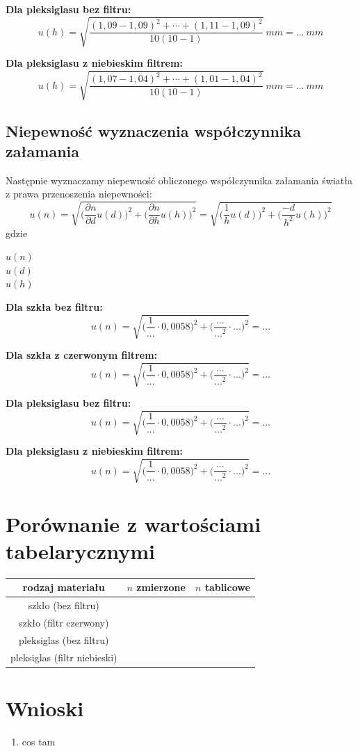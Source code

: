 \documentclass[a4paper,11pt]{article}
\begin{document}
\textbf{Dla pleksiglasu bez filtru:}
$$u(h)=\displaystyle \sqrt{\frac{(1,09-1,09)^{2}+\cdots +(1,11-1,09)^{2}}{10(10-1)}}~mm= ...~mm$$

\textbf{Dla pleksiglasu z niebieskim filtrem:}
$$u(h)=\displaystyle \sqrt{\frac{(1,07-1,04)^{2}+\cdots +(1,01-1,04)^{2}}{10(10-1)}}~mm= ...~mm$$

\subsection{Niepewność wyznaczenia współczynnika załamania}
Następnie wyznaczamy niepewność obliczonego współczynnika załamania światła z prawa przenoszenia niepewności:
$$ u(n) =\sqrt{\bigg(\frac{\partial n}{\partial d}u(d)\bigg)^2+\bigg(\frac{\partial n}{\partial h}u(h)\bigg)^2} = \sqrt{\bigg(\frac{1}{h}u(d)\bigg)^2+\bigg(\frac{-d}{h^2}u(h)\bigg)^2}$$
gdzie 
\begin{description}
\item [$u(n)$]
\item [$u(d)$]
\item [$u(h)$]
\end{description}

\textbf{Dla szkła bez filtru:}
$$ u(n) = \sqrt{\bigg(\frac{1}{...}\cdot 0,0058\bigg)^2+\bigg(\frac{...} {...^2}\cdot ...\bigg)^2} = ...$$

\textbf{Dla szkła z czerwonym filtrem:}
$$ u(n) = \sqrt{\bigg(\frac{1}{...}\cdot 0,0058\bigg)^2+\bigg(\frac{...} {...^2}\cdot ...\bigg)^2} = ...$$

\textbf{Dla pleksiglasu bez filtru:}
$$ u(n) = \sqrt{\bigg(\frac{1}{...}\cdot 0,0058\bigg)^2+\bigg(\frac{...} {...^2}\cdot ...\bigg)^2} = ...$$

\textbf{Dla pleksiglasu z niebieskim filtrem:}
$$ u(n) = \sqrt{\bigg(\frac{1}{...}\cdot 0,0058\bigg)^2+\bigg(\frac{...} {...^2}\cdot ...\bigg)^2} = ...$$

\section{Porównanie z wartościami tabelarycznymi}
\begin{table}[!h]
\begin{tabular}{|c|c|c|}
\hline
rodzaj materiału & $n$ zmierzone & $n$ tablicowe \\
\hline
szkło (bez filtru) & & \\
\hline
szkło (filtr czerwony) & & \\
\hline
pleksiglas (bez filtru) & & \\
\hline
pleksiglas (filtr niebieski) & & \\
\hline
\end{tabular}
\end{table}
\section{Wnioski}
\begin{enumerate}
\item cos tam
\end{enumerate}
\end{document}
